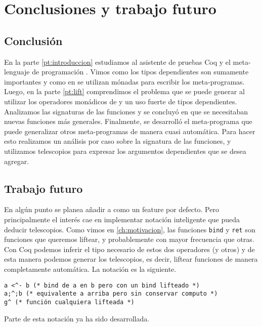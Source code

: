 \chapter{Conclusiones y trabajo futuro}\label{ch:conclusion}

\section{Conclusión}\label{sc:conclusion}

En la parte \ref{pt:introduccion} estudiamos al asistente de pruebas Coq y el meta-lenguaje de programación \mtac. Vimos como los tipos dependientes son sumamente importantes y como en \mtac se utilizan mónadas para escribir los meta-programas. 
Luego, en la parte \ref{pt:lift} comprendimos el problema que se puede generar al utilizar los operadores monádicos de \mtac y un uso fuerte de tipos dependientes. Analizamos las signaturas de las funciones y se concluyó en que se necesitaban nuevas funciones más generales.
Finalmente, se desarrolló el meta-programa \lift que puede generalizar otros meta-programas de manera cuasi automática. Para hacer esto realizamos un análisis por caso sobre la signatura de las funciones, y utilizamos telescopios para expresar los argumentos dependientes que se desea agregar.

\section{Trabajo futuro}\label{sc:futuro}

En algún punto se planea añadir \lift a \mtac como un feature por defecto. Pero principalmente el interés cae en implementar notación inteligente que pueda deducir telescopios. Como vimos en \ref{ch:motivacion}, las funciones \lstinline{bind} y \lstinline{ret} son funciones que queremos liftear, y probablemente con mayor frecuencia que otras. Con Coq podemos inferir el tipo necesario de estos dos operadores (y otros) y de esta manera podemos generar los telescopios, es decir, liftear funciones de manera completamente automática.
La notación es la siguiente.

\begin{lstlisting}
a <^- b (* bind de a en b pero con un bind lifteado *)
a;^;b (* equivalente a arriba pero sin conservar computo *)
g^ (* función cualquiera lifteada *)
\end{lstlisting}

Parte de esta notación ya ha sido desarrollada.